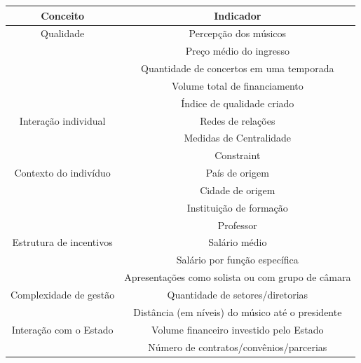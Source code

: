 \documentclass[a4paper, 12pt, openright, oneside, german, french, english, brazil]{abntex2}
\begin{document}
	\begin{table}[ht]
		{\begin{tabular}{|c|c|}

				\hline
				\textbf{Conceito} & \textbf{Indicador} \\
				\hline
				Qualidade   &  Percepção dos músicos \\
				            &  Preço médio do ingresso\\
				            &  Quantidade de concertos em uma temporada\\
				            &  Volume total de financiamento\\
				            &  Índice de qualidade criado \\
				\hline

				Interação individual & Redes de relações \\
									 & Medidas de Centralidade  \\
									 & Constraint      \\
				\hline
				Contexto do indivíduo & País de origem  \\
									  & Cidade de origem  \\
									  & Instituição de formação \\
									  & Professor    \\
				\hline
				Estrutura de incentivos & Salário médio  \\
										& Salário por função específica \\
										& Apresentações como solista ou com grupo de câmara \\
				\hline
				Complexidade de gestão  & Quantidade de setores/diretorias  \\
										& Distância (em níveis) do músico até o presidente \\
				\hline
				Interação com o Estado  & Volume financeiro investido pelo Estado  \\
										& Número de contratos/convênios/parcerias \\
				\hline


			\end{tabular}
		}
	{}

	\end{table}


\end{document}
